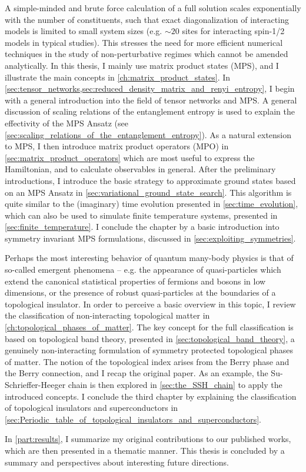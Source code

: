 A simple-minded and brute force calculation of a full solution scales exponentially with the number of constituents, such that exact diagonalization of interacting models is limited to small system sizes (e.g. $\sim 20$ sites for interacting spin-1/2 models in typical studies).
This stresses the need for more efficient numerical techniques in the study of non-perturbative regimes which cannot be amended analytically.
In this thesis, I mainly use matrix product states (MPS), and I illustrate the main concepts in \cref{ch:matrix_product_states}.
In \cref{sec:tensor_networks,sec:reduced_density_matrix_and_renyi_entropy}, I begin with a general introduction into the field of tensor networks and MPS.
A general discussion of scaling relations of the entanglement entropy is used to explain the effectivity of the MPS Ansatz (see \cref{sec:scaling_relations_of_the_entanglement_entropy}).
As a natural extension to MPS, I then introduce matrix product operators (MPO) in \cref{sec:matrix_product_operators} which are most useful to express the Hamiltonian, and to calculate observables in general.
After the preliminary introductions, I introduce the basic strategy to approximate ground states based on an MPS Ansatz in \cref{sec:variational_ground_state_search}.
This algorithm is quite similar to the (imaginary) time evolution presented in \cref{sec:time_evolution}, which can also be used to simulate finite temperature systems, presented in \cref{sec:finite_temperature}.
I conclude the chapter by a basic introduction into symmetry invariant MPS formulations, discussed in \cref{sec:exploiting_symmetries}.

Perhaps the most interesting behavior of quantum many-body physics is that of so-called emergent phenomena -- e.g. the appearance of quasi-particles which extend the canonical statistical properties of fermions and bosons in low dimensions, or the presence of robust quasi-particles at the boundaries of a topological insulator.
In order to perceive a basic overview in this topic, I review the classification of non-interacting topological matter in \cref{ch:topological_phases_of_matter}.
The key concept for the full classification is based on topological band theory, presented in \cref{sec:topological_band_theory}, a genuinely non-interacting formulation of symmetry protected topological phases of matter.
The notion of the topological index arises from the Berry phase and the Berry connection, and I recap the original paper.
As an example, the Su-Schrieffer-Heeger chain is then explored in \cref{sec:the_SSH_chain} to apply the introduced concepts.
I conclude the third chapter by explaining the classification of topological insulators and superconductors in \cref{sec:Periodic_table_of_topological_insulators_and_superconductors}.

In \cref{part:results}, I summarize my original contributions to our published works, which are then presented in a thematic manner.
This thesis is concluded by a summary and perspectives about interesting future directions.
